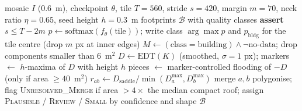 \documentclass[10pt,a4paper,twocolumn]{article}
\newcommand{\dinoseg}{StrongDINOv2Seg}
\begin{document}
\begin{algorithm}[htbp]
\footnotesize
\caption{Tiled \dinoseg{} inference and distance-transform building extraction (EDT: Euclidean distance transform; $h$-maxima: regional maxima of height $h$ used as seeds) (\texttt{run\_tiled\_inference.py}, \texttt{extract\_buildings\_v8.py})}
\label{alg:extract}
\begin{algorithmic}[1]
\Require mosaic $I$ (0.6~m), checkpoint $\theta$, tile $T=560$, stride $s=420$, margin $m=70$, neck ratio $\eta=0.65$, seed height $h=0.3$~m
\Ensure footprints $\mathcal B$ with quality classes
\State \textbf{assert} $s\le T-2m$ 
  \State $p\gets\mathrm{softmax}(f_\theta(\text{tile}))$; write class $\arg\max p$ and $p_{\mathrm{bldg}}$ for the tile centre (drop $m$ px at inner edges)
\EndFor
\State $M\gets(\text{class}=\text{building})\wedge\lnot\text{no-data}$; drop components smaller than 6~m$^2$
  \State $D\gets\mathrm{EDT}(K)$ (smoothed, $\sigma=1$ px); markers $\gets$ $h$-maxima of $D$ with height $h$
  \State pieces $\gets$ marker-controlled flooding of $-D$ (only if area $\ge 40$~m$^2$)
    \State $r_{ab}\gets D_{\mathrm{saddle}}/\min(D_a^{\max},D_b^{\max})$
     merge $a,b$ 
    \EndIf
  \EndFor
\EndFor
\State polygonise; flag \textsc{Unresolved\_Merge} if area $>4\times$ the median compact roof; assign \textsc{Plausible} / \textsc{Review} / \textsc{Small} by confidence and shape
\State \Return $\mathcal B$
\end{algorithmic}
\end{algorithm}
\end{document}
